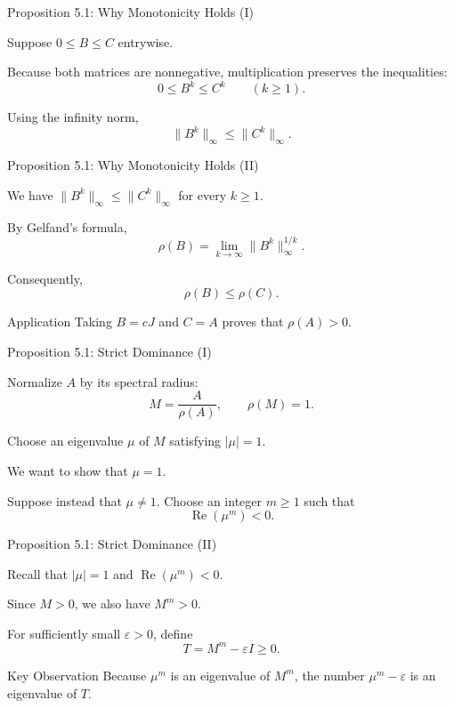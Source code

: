 
\begin{frame}{Proposition 5.1: Why Monotonicity Holds (I)}
\small

Suppose $0\leq B\leq C$ entrywise.

Because both matrices are nonnegative,
multiplication preserves the inequalities:
\[
0\leq B^k\leq C^k
\qquad(k\geq1).
\]

Using the infinity norm,
\[
\|B^k\|_\infty\leq\|C^k\|_\infty.
\]
\end{frame}

\begin{frame}{Proposition 5.1: Why Monotonicity Holds (II)}
\small

We have $\|B^k\|_\infty\leq\|C^k\|_\infty$ for every $k\geq1$.

By Gelfand's formula,
\[
\rho(B)=\lim_{k\to\infty}
\|B^k\|_\infty^{1/k}.
\]

Consequently,
\[
\boxed{\rho(B)\leq\rho(C).}
\]

\begin{block}{Application}
Taking $B=cJ$ and $C=A$ proves
that $\rho(A)>0$.
\end{block}
\end{frame}

\begin{frame}{Proposition 5.1: Strict Dominance (I)}
\small

Normalize $A$ by its spectral radius:
\[
M=\frac{A}{\rho(A)},\qquad \rho(M)=1.
\]

Choose an eigenvalue $\mu$ of $M$ satisfying
$|\mu|=1$.

We want to show that $\mu=1$.

Suppose instead that $\mu\neq1$.
Choose an integer $m\geq1$ such that
\[
\operatorname{Re}(\mu^m)<0.
\]
\end{frame}

\begin{frame}{Proposition 5.1: Strict Dominance (II)}
\small

Recall that $|\mu|=1$ and $\operatorname{Re}(\mu^m)<0$.

Since $M>0$, we also have $M^m>0$.

For sufficiently small $\varepsilon>0$,
define
\[
T=M^m-\varepsilon I\geq0.
\]

\begin{block}{Key Observation}
Because $\mu^m$ is an eigenvalue of $M^m$,
the number $\mu^m-\varepsilon$ is an
eigenvalue of $T$.
\end{block}
\end{frame}

